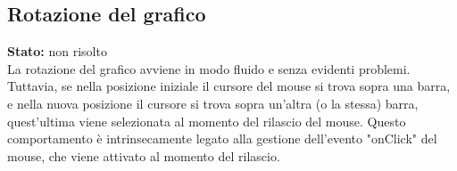 \subsection{Rotazione del grafico}
\textbf{Stato:} non risolto\\
La rotazione del grafico avviene in modo fluido e senza evidenti problemi. Tuttavia,
se nella posizione iniziale il cursore del mouse si trova sopra una barra, e
nella nuova posizione il cursore si trova sopra un'altra (o la stessa) barra,
quest'ultima viene selezionata al momento del rilascio del mouse.
Questo comportamento è intrinsecamente legato alla
gestione dell'evento "onClick" del mouse, che viene attivato al momento del rilascio.